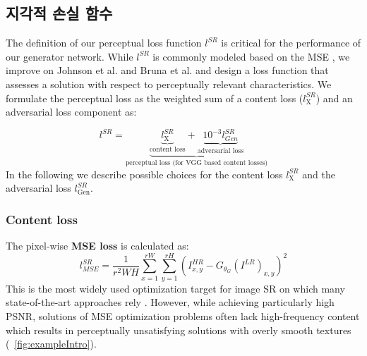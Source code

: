 \documentclass[10pt,twocolumn,letterpaper]{article}
\newcommand{\kor}[1]{#1}
\newcommand{\eng}[1]{}
\begin{document}
\subsection{\eng{Perceptual loss function}\kor{지각적 손실 함수}}
\label{sec:losses}
The definition of our perceptual loss function $l^{SR}$  is critical for the performance of our generator network.
While $l^{SR}$ is commonly modeled based on the \ac{MSE}  \cite{dong2016image,Shi2016ESPCN}, we improve on Johnson et al. \cite{Johnson16PercepLoss} and Bruna et al. \cite{bruna2016super} and design a loss function that assesses a solution with respect to perceptually relevant characteristics.
We formulate the perceptual loss as the weighted sum of a content loss ($l^{SR}_\textrm{X}$) and an adversarial loss component as:

\begin{equation}
l^{SR} = \underbrace{\underbrace{l^{SR}_\textrm{X}}_{\text{content loss}} + \underbrace{10^{-3} l^{SR}_{Gen}}_{\text{adversarial loss}}}_{\text{perceptual loss (for VGG based content losses)}}
\end{equation}
In the following we describe possible choices for the content loss $l^{SR}_\textrm{X}$ and the adversarial loss $l^{SR}_\textrm{Gen}$.

\subsubsection{Content loss}

The pixel-wise \textbf{\ac{MSE} loss} is calculated as:
\begin{equation}
l^{SR}_{MSE} = \frac{1}{r^2WH} \sum_{x=1}^{rW} \sum_{y=1}^{rH} (I^{HR}_{x,y} - G_{\theta_G}(I^{LR})_{x,y})^2
\end{equation}
This is the most widely used optimization target for image \ac{SR} on which many state-of-the-art approaches rely \cite{dong2016image,Shi2016ESPCN}. However, while achieving particularly high \ac{PSNR}, solutions of \ac{MSE} optimization problems often lack high-frequency content which results in perceptually unsatisfying solutions with overly smooth textures (\cf \figurename~\ref{fig:exampleIntro}).
\end{document}
